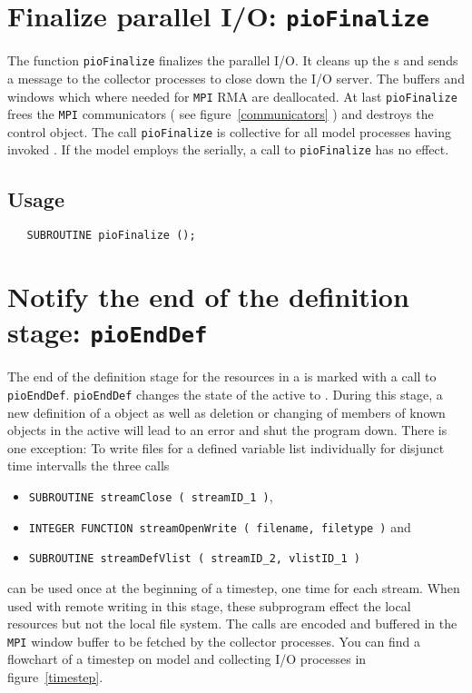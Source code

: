 \section{Finalize parallel I/O: {\tt pioFinalize}}
\label{pioFinalize}
The function {\tt pioFinalize} finalizes the parallel I/O. It cleans up the 
{}s and sends a message to the collector processes 
to close down the I/O server. The buffers and windows which where needed for 
{\tt MPI} RMA are deallocated. At last {\tt pioFinalize} frees the {\tt MPI} 
communicators ( see figure~\ref{communicators} ) 
 and destroys the control object. The call {\tt pioFinalize} is collective for all 
model processes having invoked {}. If the 
model employs the {\CDI} serially, a  
call to {\tt pioFinalize} has no effect.   

\subsection*{Usage}
\begin{verbatim}
   SUBROUTINE pioFinalize ();
\end{verbatim}
\section{Notify the end of the definition stage: {\tt pioEndDef}}
\label{pioEndDef}
The end of the definition stage for the {\CDI} resources in a 
{} is 
marked with a call to {\tt pioEndDef}. {\tt pioEndDef} changes the state of 
the active {} to 
{}. 
During this stage, a new 
definition of a {\CDI} object as well as deletion or changing of members of 
known objects in the active {} will lead to an error 
and shut the program down. There is one 
exception: To write files for a defined variable list individually for 
disjunct time intervalls the three calls
\begin{itemize} 
\item {\tt SUBROUTINE streamClose ( streamID\_1 )}, 
\item {\tt INTEGER FUNCTION streamOpenWrite ( filename, filetype )} and 
\item {\tt SUBROUTINE streamDefVlist ( streamID\_2, vlistID\_1 )} 
\end{itemize}
can be used once at the beginning of a timestep, one time for each stream. When 
used with remote writing in this stage, these subprogram effect the local {\CDI} 
resources but not 
the local file system. The calls are encoded and buffered in the 
{\tt MPI} window buffer to be fetched by the collector processes. You can find a 
flowchart of a timestep on model and collecting I/O processes in figure~\ref{timestep}.
\smallskip 

